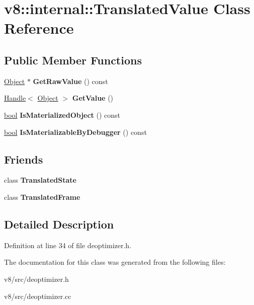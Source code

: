 \hypertarget{classv8_1_1internal_1_1TranslatedValue}{}\section{v8\+:\+:internal\+:\+:Translated\+Value Class Reference}
\label{classv8_1_1internal_1_1TranslatedValue}
\subsection*{Public Member Functions}
\begin{DoxyCompactItemize}
\item 
\mbox{\label{classv8_1_1internal_1_1TranslatedValue_a1823ae88d983f5388190e32084a426a9}} 
\mbox{\hyperlink{classv8_1_1internal_1_1Object}{Object}} $\ast$ {\bfseries Get\+Raw\+Value} () const
\item 
\mbox{\label{classv8_1_1internal_1_1TranslatedValue_a8c9c57e125553e13c254225801b820f6}} 
\mbox{\hyperlink{classv8_1_1internal_1_1Handle}{Handle}}$<$ \mbox{\hyperlink{classv8_1_1internal_1_1Object}{Object}} $>$ {\bfseries Get\+Value} ()
\item 
\mbox{\label{classv8_1_1internal_1_1TranslatedValue_abc632f5fb2d00e9b3252769e8cdd1ccc}} 
\mbox{\hyperlink{classbool}{bool}} {\bfseries Is\+Materialized\+Object} () const
\item 
\mbox{\label{classv8_1_1internal_1_1TranslatedValue_acb1f1a5df1ae14c79550983fa517effa}} 
\mbox{\hyperlink{classbool}{bool}} {\bfseries Is\+Materializable\+By\+Debugger} () const
\end{DoxyCompactItemize}
\subsection*{Friends}
\begin{DoxyCompactItemize}
\item 
\mbox{\label{classv8_1_1internal_1_1TranslatedValue_a93214c289745cbbfea7af56c3a474a3b}} 
class {\bfseries Translated\+State}
\item 
\mbox{\label{classv8_1_1internal_1_1TranslatedValue_ad4b90445e09d78ff767023f5f395b382}} 
class {\bfseries Translated\+Frame}
\end{DoxyCompactItemize}


\subsection{Detailed Description}


Definition at line 34 of file deoptimizer.\+h.



The documentation for this class was generated from the following files\+:\begin{DoxyCompactItemize}
\item 
v8/src/deoptimizer.\+h\item 
v8/src/deoptimizer.\+cc\end{DoxyCompactItemize}
